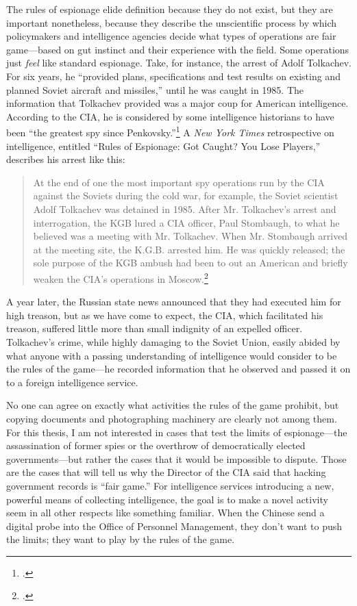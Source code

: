 \documentclass{memoir}
\begin{document}
\begin{refsegment}
The rules of espionage elide definition because they do not exist, but they are important nonetheless, because they describe the unscientific process by which policymakers and intelligence agencies decide what types of operations are fair game---based on gut instinct and their experience with the field. Some operations just \emph{feel} like standard espionage. Take, for instance, the arrest of Adolf Tolkachev.  For six years, he ``provided plans, specifications and test results on existing and planned Soviet aircraft and missiles,'' until he was caught in 1985. The information that Tolkachev provided was a major coup for American intelligence. According to the CIA, he is considered by some intelligence historians to have been ``the greatest spy since Penkovsky.''\footcite{cia_look_2008} A \emph{New York Times} retrospective on intelligence, entitled ``Rules of Espionage: Got Caught? You Lose Players,'' describes his arrest like this:

\begin{quote}
At the end of one the most important spy operations run by the CIA against the Soviets during the cold war, for example, the Soviet scientist Adolf Tolkachev was detained in 1985. After Mr. Tolkachev's arrest and interrogation, the KGB lured a CIA officer, Paul Stombaugh, to what he believed was a meeting with Mr. Tolkachev. When Mr. Stombaugh arrived at the meeting site, the K.G.B. arrested him. He was quickly released; the sole purpose of the KGB ambush had been to out an American and briefly weaken the CIA's operations in Moscow.\footcite{risen_rules_2001}
\end{quote}
A year later, the Russian state news announced that they had executed him for high treason, but as we have come to expect, the CIA, which facilitated his treason, suffered little more than small indignity of an expelled officer. Tolkachev's crime, while highly damaging to the Soviet Union, easily abided by what anyone with a passing understanding of intelligence would consider to be the rules of the game---he recorded information that he observed and passed it on to a foreign intelligence service.

No one can agree on exactly what activities the rules of the game prohibit, but copying documents and photographing machinery are clearly not among them. For this thesis, I am not interested in cases that test the limits of espionage---the assassination of former spies or the overthrow of democratically elected governments---but rather the cases that it would be impossible to dispute. Those are the cases that will tell us why the Director of the CIA said that hacking government records is ``fair game.'' For intelligence services introducing a new, powerful means of collecting intelligence, the goal is to make a novel activity seem in all other respects like something familiar. When the Chinese send a digital probe into the Office of Personnel Management, they don't want to push the limits; they want to play by the rules of the game.


\end{refsegment}
\end{document}
